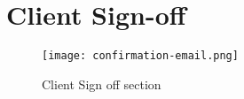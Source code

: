 \chapter{Client Sign-off}
\label{appendix:client-sign-off}

\begin{figure}[!hbt]
  	\centering
 	\texttt{[image: confirmation-email.png]}
 	\caption{Client Sign off section}
\end{figure}
